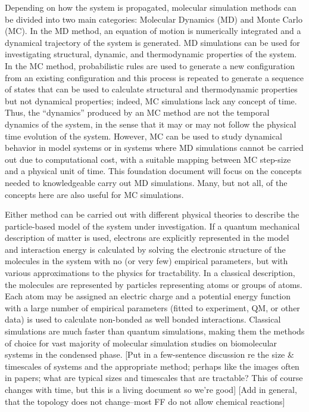 \documentclass[9pt,bestpractices]{livecoms}
\begin{document}
Depending on how the system is propagated, molecular simulation methods can be divided into two main categories: Molecular Dynamics (MD) and Monte Carlo (MC). In the MD method, an equation of motion is numerically integrated and a dynamical trajectory of the system is generated. MD simulations can be used for investigating structural, dynamic, and thermodynamic properties of the system. In the MC method, probabilistic rules are used to generate a new configuration from an existing configuration and this process is repeated to generate a sequence of states that can be used to calculate structural and thermodynamic properties but not dynamical properties; indeed, MC simulations lack any concept of time.
Thus, the ``dynamics'' produced by an MC method are not the temporal dynamics of the system, in the sense that it may or may not follow the physical time evolution of the system. However,  MC can be used  to study dynamical behavior in model systems or in systems where MD simulations cannot be carried out due to computational cost, with a suitable mapping between MC step-size and a physical unit of time. This foundation document will focus on the concepts needed to knowledgeable carry out MD simulations. Many, but not all, of the concepts here are also useful for MC simulations. 

Either method can be carried out with different physical theories to describe the particle-based model of the system under investigation. If a quantum mechanical description of matter is used, electrons are explicitly represented in the model and interaction energy is calculated by solving the electronic structure of the molecules in the system with no (or very few) empirical parameters, but with various approximations to the physics for tractability. In a classical description, the molecules are represented by particles representing atoms or groups of atoms. Each atom may be assigned an electric charge and a potential energy function with a large number of empirical parameters (fitted to experiment, QM, or other data)  is used to calculate non-bonded as well bonded interactions. Classical simulations are much faster than quantum simulations, making them the methods of choice for vast majority of molecular simulation studies on biomolecular systems in the condensed phase. {\color{red} [Put in a few-sentence discussion re the size \& timescales of systems and the appropriate method; perhaps like the images often in papers; what are typical sizes and timescales that are tractable? This of course changes with time, but this is a living document so we're good] [Add in general, that the topology does not change--most FF do not allow chemical reactions]}
\end{document}
